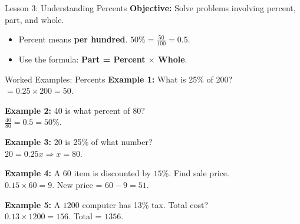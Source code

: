 \documentclass{beamer}
\begin{document}
\begin{frame}{Lesson 3: Understanding Percents}
\textbf{Objective:} Solve problems involving percent, part, and whole.
\begin{itemize}
    \item Percent means \textbf{per hundred}. $50\% = \frac{50}{100} = 0.5$.
    \item Use the formula: \textbf{Part = Percent $\times$ Whole}.
\end{itemize}
\vspace{1em}
\begin{center}
\end{center}
\end{frame}

\begin{frame}{Worked Examples: Percents}
\textbf{Example 1:} What is 25\% of 200?\\
$= 0.25 \times 200 = 50$.

\vspace{0.5em}
\textbf{Example 2:} 40 is what percent of 80?\\
$\frac{40}{80} = 0.5 = 50\%$.

\vspace{0.5em}
\textbf{Example 3:} 20 is 25\% of what number?\\
$20 = 0.25x \Rightarrow x = 80$.

\vspace{0.5em}
\textbf{Example 4:} A $60$ item is discounted by $15\%$. Find sale price.\\
$0.15 \times 60 = 9$. New price = $60 - 9 = 51$.

\vspace{0.5em}
\textbf{Example 5:} A $1200$ computer has 13\% tax. Total cost?\\
$0.13 \times 1200 = 156$. Total = $1356$.
\end{frame}
\end{document}
